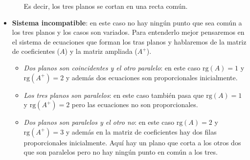 \documentclass[a4paper,11pt,answers]{exam}
\newcommand\rango[1]{\mathrm{rg}(#1)}
\begin{document}
\begin{itemize}
\begin{itemize}
\begin{center}
  \end{center}
  Es decir, los tres planos se cortan en una recta común.
  \end{itemize}


\item \textbf{Sistema incompatible}: en este caso no hay ningún punto que sea común a los tres planos y los casos son variados. Para entenderlo mejor pensaremos en el sistema de ecuaciones que forman los tras planos y hablaremos de la matriz de coeficientes ($A$) y la matriz ampliada ($A^+$).
  \begin{itemize}
    \item \emph{Dos planos son coincidentes y el otro paralelo}: en este caso $\rango{A}=1$ y $\rango{A^+}=2$ y además dos ecuaciones son proporcionales inicialmente.
    \item \emph{Los tres planos son paralelos}: en este caso también pasa que $\rango{A}=1$ y $\rango{A^+}=2$ pero las ecuaciones no son proporcionales.
    \item \emph{Dos planos son paralelos y el otro no}: en este caso $\rango{A}=2$ y $\rango{A^+}=3$ y además en la matriz de coeficientes hay dos filas proporcionales inicialmente. Aquí hay un plano que corta a los otros dos que son paralelos pero no hay ningún punto en común a los tres.
          \begin{center}
\end{center}
\end{itemize}
\end{itemize}
\end{document}
